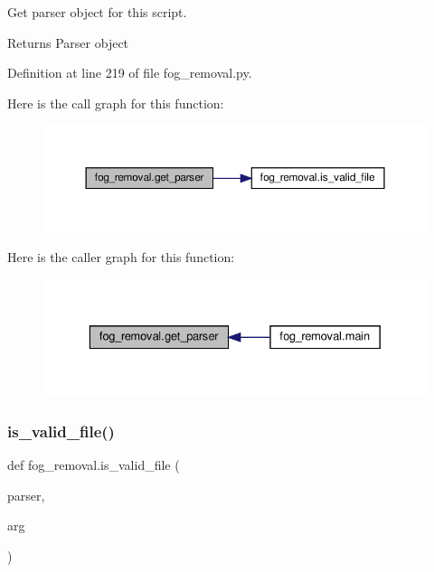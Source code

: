 Get parser object for this script. 

\begin{DoxyReturn}{Returns}
Parser object 
\end{DoxyReturn}


Definition at line 219 of file fog\+\_\+removal.\+py.

Here is the call graph for this function\+:\nopagebreak
\begin{figure}[H]
\begin{center}
\leavevmode
\includegraphics[width=350pt]{namespacefog__removal_a89c98f8f9a6d048485938fc05675ce9e_cgraph}
\end{center}
\end{figure}
Here is the caller graph for this function\+:\nopagebreak
\begin{figure}[H]
\begin{center}
\leavevmode
\includegraphics[width=329pt]{namespacefog__removal_a89c98f8f9a6d048485938fc05675ce9e_icgraph}
\end{center}
\end{figure}
\mbox{\label{namespacefog__removal_a7b07384f6a6ff8498e14f3aa5f8e2252}} 
\subsubsection{\texorpdfstring{is\+\_\+valid\+\_\+file()}{is\_valid\_file()}}
{\footnotesize\ttfamily def fog\+\_\+removal.\+is\+\_\+valid\+\_\+file (\begin{DoxyParamCaption}\item[{}]{parser,  }\item[{}]{arg }\end{DoxyParamCaption})}



